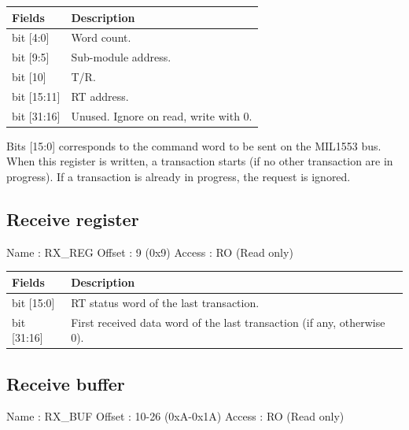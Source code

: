 \documentclass[11pt,a4paper]{article}
\begin{document}
\begin{table}[h!]
  \begin{tabularx}{\textwidth}{ l X }
    \hline
    \textbf{Fields} & \textbf{Description}\\
    \hline
    bit [4:0]   & Word count. \\
    bit [9:5]   & Sub-module address. \\
    bit [10]    & T/R. \\
    bit [15:11] & RT address. \\
    bit [31:16] & Unused. Ignore on read, write with 0. \\
    \hline
  \end{tabularx}
\end{table}

Bits [15:0] corresponds to the command word to be sent on the MIL1553 bus.
When this register is written, a transaction starts (if no other transaction are
in progress). If a transaction is already in progress, the request is ignored.

\subsection{Receive register}

Name   : RX\_REG \newline
Offset : 9 (0x9) \newline
Access : RO (Read only) \newline

\begin{table}[h!]
  \begin{tabularx}{\textwidth}{ l X }
    \hline
    \textbf{Fields} & \textbf{Description}\\
    \hline
    bit [15:0]  & RT status word of the last transaction. \\
    bit [31:16] & First received data word of the last transaction (if any, otherwise 0). \\
    \hline
  \end{tabularx}
\end{table}

\subsection{Receive buffer}

Name   : RX\_BUF \newline
Offset : 10-26 (0xA-0x1A) \newline
Access : RO (Read only) \newline
\end{document}
